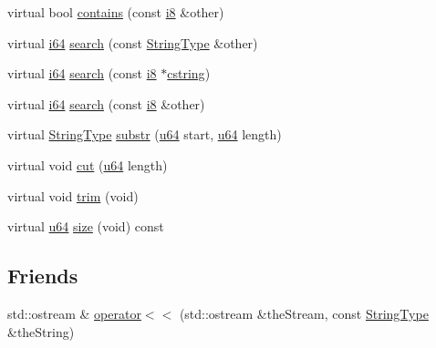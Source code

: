\begin{DoxyCompactItemize}
\item 
virtual bool \hyperlink{classcrap_1_1types_1_1_string_type_a375d7dbc736770bd3174970fb626e56e}{contains} (const \hyperlink{types_8h_ae3702327b5f47e83b431e22b33da7b58}{i8} \&other)
\item 
virtual \hyperlink{types_8h_a85cb35fbe5bf2961d7ad5f26814a91a2}{i64} \hyperlink{classcrap_1_1types_1_1_string_type_a64dccc0cc06f3538660e782a43ab8f65}{search} (const \hyperlink{classcrap_1_1types_1_1_string_type}{String\-Type} \&other)
\item 
virtual \hyperlink{types_8h_a85cb35fbe5bf2961d7ad5f26814a91a2}{i64} \hyperlink{classcrap_1_1types_1_1_string_type_a5c90ea8f14bf8ad0073166ec09ed3532}{search} (const \hyperlink{types_8h_ae3702327b5f47e83b431e22b33da7b58}{i8} $\ast$\hyperlink{types_8h_a5849681cb91aa8afef6996d9d9e90881}{cstring})
\item 
virtual \hyperlink{types_8h_a85cb35fbe5bf2961d7ad5f26814a91a2}{i64} \hyperlink{classcrap_1_1types_1_1_string_type_a3646c1e3c2868c3deef46c499addc76e}{search} (const \hyperlink{types_8h_ae3702327b5f47e83b431e22b33da7b58}{i8} \&other)
\item 
virtual \hyperlink{classcrap_1_1types_1_1_string_type}{String\-Type} \hyperlink{classcrap_1_1types_1_1_string_type_a18aecdc9e5a7a5b796bb821bce8d6b84}{substr} (\hyperlink{types_8h_a3f7e2bcbb0b4c338f3c4f6c937cd4234}{u64} start, \hyperlink{types_8h_a3f7e2bcbb0b4c338f3c4f6c937cd4234}{u64} length)
\item 
virtual void \hyperlink{classcrap_1_1types_1_1_string_type_a1f4ebfbcdfe55a123b842ac5cc62de63}{cut} (\hyperlink{types_8h_a3f7e2bcbb0b4c338f3c4f6c937cd4234}{u64} length)
\item 
virtual void \hyperlink{classcrap_1_1types_1_1_string_type_abb48d7045dde133e5fdaca3931fb98ce}{trim} (void)
\item 
virtual \hyperlink{types_8h_a3f7e2bcbb0b4c338f3c4f6c937cd4234}{u64} \hyperlink{classcrap_1_1types_1_1_string_type_a3fa2463111147974522a81ed18ecebd0}{size} (void) const 
\end{DoxyCompactItemize}
\subsection*{Friends}
\begin{DoxyCompactItemize}
\item 
std\-::ostream \& \hyperlink{classcrap_1_1types_1_1_string_type_ad095f64d4f01e53e91f0b02fb6ab3880}{operator$<$$<$} (std\-::ostream \&the\-Stream, const \hyperlink{classcrap_1_1types_1_1_string_type}{String\-Type} \&the\-String)
\end{DoxyCompactItemize}


